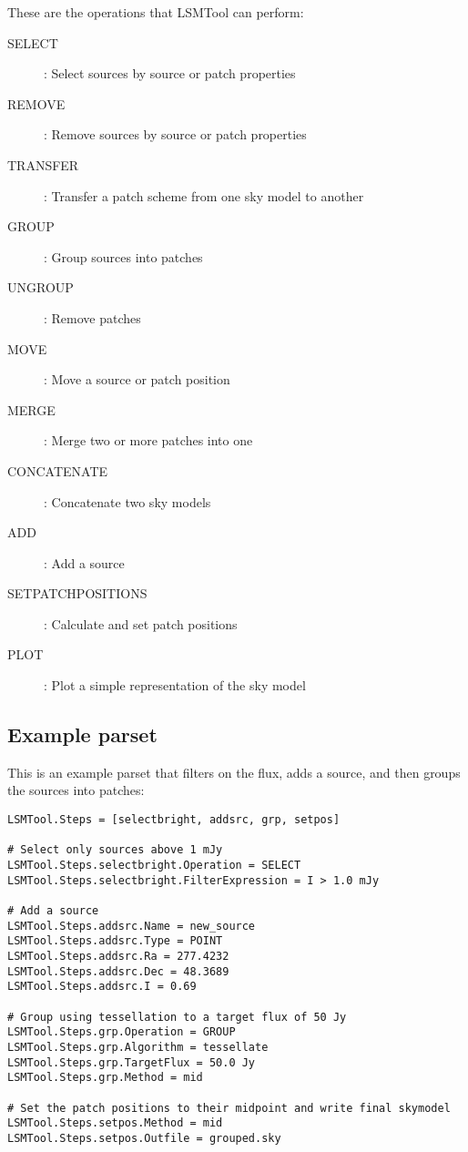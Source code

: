 \documentclass[structabstract]{article}
\begin{document}
These are the operations that LSMTool can perform:
\begin{description}
 \item[SELECT]: Select sources by source or patch properties
 \item[REMOVE]: Remove sources by source or patch properties
 \item[TRANSFER]: Transfer a patch scheme from one sky model to another
 \item[GROUP]: Group sources into patches
 \item[UNGROUP]: Remove patches
 \item[MOVE]: Move a source or patch position
 \item[MERGE]: Merge two or more patches into one
 \item[CONCATENATE]: Concatenate two sky models
 \item[ADD]: Add a source
 \item[SETPATCHPOSITIONS]: Calculate and set patch positions
 \item[PLOT]: Plot a simple representation of the sky model
\end{description}


\subsection{Example parset}
\label{lsmtool:parset}

This is an example parset that filters on the flux, adds a source, and then groups the sources into patches:
\begin{verbatim}
LSMTool.Steps = [selectbright, addsrc, grp, setpos]

# Select only sources above 1 mJy
LSMTool.Steps.selectbright.Operation = SELECT
LSMTool.Steps.selectbright.FilterExpression = I > 1.0 mJy

# Add a source
LSMTool.Steps.addsrc.Name = new_source
LSMTool.Steps.addsrc.Type = POINT
LSMTool.Steps.addsrc.Ra = 277.4232
LSMTool.Steps.addsrc.Dec = 48.3689
LSMTool.Steps.addsrc.I = 0.69

# Group using tessellation to a target flux of 50 Jy
LSMTool.Steps.grp.Operation = GROUP
LSMTool.Steps.grp.Algorithm = tessellate
LSMTool.Steps.grp.TargetFlux = 50.0 Jy
LSMTool.Steps.grp.Method = mid

# Set the patch positions to their midpoint and write final skymodel
LSMTool.Steps.setpos.Method = mid
LSMTool.Steps.setpos.Outfile = grouped.sky
\end{verbatim}
\end{document}
